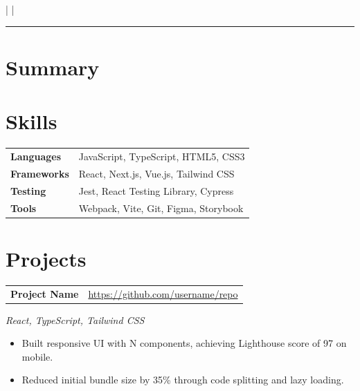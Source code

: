 \documentclass[10pt, a4paper]{article}
\makeatletter
\newcommand{\contactitem}[1]{\small #1}
\newcommand{\projectentry}[4]{%
  \noindent
  \begin{tabularx}{\linewidth}{@{}X r@{}}
    \textbf{#1} & \href{#3}{\textcolor{subtle}{\small #3}}
  \end{tabularx}
  \vspace{1pt}
  \textcolor{subtle}{\small \textit{#2}}
  \vspace{1pt}
  #4
  \vspace{6pt}
}
\makeatother
\begin{document}

\begin{center}
  {\LARGE\bfseries\color{accent} \VarName}\\[4pt]
  {\small \VarRole}\\[6pt]
  \contactitem{\VarEmail}
  \quad\textcolor{subtle}{|}\quad
  \contactitem{\VarPhone}
  \quad\textcolor{subtle}{|}\quad
  \contactitem{\VarLocation}
\end{center}

\vspace{4pt}
\textcolor{accent}{\rule{\linewidth}{0.8pt}}
\vspace{6pt}

\section{Summary}
\VarSummary

\section{Skills}
\noindent
\begin{tabularx}{\linewidth}{@{} l X @{}}
  \textbf{Languages}   & JavaScript, TypeScript, HTML5, CSS3 \\[2pt]
  \textbf{Frameworks}  & React, Next.js, Vue.js, Tailwind CSS \\[2pt]
  \textbf{Testing}     & Jest, React Testing Library, Cypress \\[2pt]
  \textbf{Tools}       & Webpack, Vite, Git, Figma, Storybook \\
\end{tabularx}

\section{Projects}
\projectentry{Project Name}{React, TypeScript, Tailwind CSS}{https://github.com/username/repo}{%
  \begin{itemize}
    \item Built responsive UI with N components, achieving Lighthouse score of 97 on mobile.
    \item Reduced initial bundle size by 35\% through code splitting and lazy loading.
  \end{itemize}
}
\end{document}
